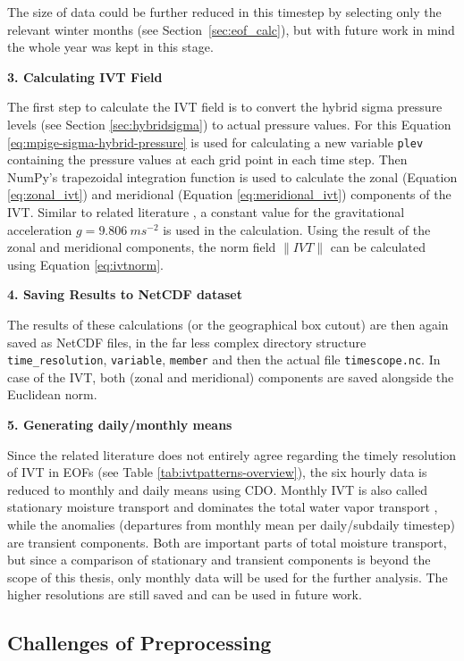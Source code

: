The size of data could be further reduced in this timestep by selecting only the relevant winter months (see Section~\ref{sec:eof_calc}), but with future work in mind the whole year was kept in this stage. 

\textbf{3. Calculating IVT Field}

The first step to calculate the IVT field is to convert the hybrid sigma pressure levels (see Section \ref{sec:hybridsigma}) to actual pressure values. 
For this Equation \ref{eq:mpige-sigma-hybrid-pressure} is used for calculating a new variable \texttt{plev} containing the pressure values at each grid point in each time step. 
Then NumPy's trapezoidal integration function is used to calculate the zonal (Equation \ref{eq:zonal_ivt}) and meridional (Equation \ref{eq:meridional_ivt}) components of the IVT. 
Similar to related literature \cite{ayantobo_integrated_2022}, a constant value for the gravitational acceleration $g = 9.806~ms^{-2}$ is used in the calculation. 
Using the result of the zonal and meridional components, the norm field $\lVert IVT \rVert$ can be calculated using Equation \ref{eq:ivtnorm}. 



\textbf{4. Saving Results to NetCDF dataset}

The results of these calculations (or the geographical box cutout) are then again saved as NetCDF files, in the far less complex directory structure \texttt{time\_resolution}, \texttt{variable}, \texttt{member} and then the actual file \texttt{timescope.nc}. 
In case of the IVT, both (zonal and meridional) components are saved alongside the Euclidean norm. 


\textbf{5. Generating daily/monthly means}

Since the related literature does not entirely agree regarding the timely resolution of IVT in EOFs (see Table \ref{tab:ivtpatterns-overview}), the six hourly data is reduced to monthly and daily means using CDO.
Monthly IVT is also called stationary moisture transport and dominates the total water vapor transport \cite{zhou_atmospheric_2005}, while the anomalies (departures from monthly mean per daily/subdaily timestep) are transient components.
Both are important parts of total moisture transport, but since a comparison of stationary and transient components is beyond the scope of this thesis, only monthly data will be used for the further analysis. 
The higher resolutions are still saved and can be used in future work. 

\subsection{Challenges of Preprocessing}
\label{sec:preprocessing challanges}

